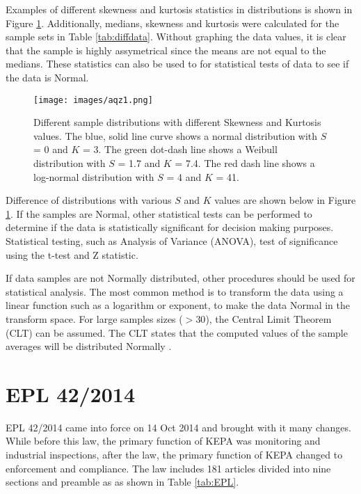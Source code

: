 Examples of different skewness and kurtosis statistics in distributions is shown in Figure \ref{fig:distr}. Additionally, medians, skewness and kurtosis were calculated for the sample sets in Table \ref{tab:diffdata}. Without graphing the data values, it is clear that the sample is highly assymetrical since the means are not equal to the medians. These statistics can also be used to for statistical tests of data to see if the data is Normal. 
%
\begin{figure}[!htpb]
\centering
\texttt{[image: images/aqz1.png]} 
\caption[Different sample distributions with different Skewness and Kurtosis values.]{Different sample distributions with different Skewness and Kurtosis values. The blue, solid line curve shows a normal distribution with $S$ = 0 and $K$ = 3. The green dot-dash line shows a Weibull distribution with $S$ = 1.7 and $K$ = 7.4.  The red dash line shows a log-normal distribution with $S$ = 4 and $K$ = 41. }
\label{fig:distr}
\end{figure}
%
Difference of distributions with various $S$ and $K$ values are shown below in Figure \ref{fig:distr}.  If the samples are Normal, other statistical tests can be performed to determine if the data is statistically significant for decision making purposes. Statistical testing, such as Analysis of Variance (ANOVA), test of significance using the t-test and Z statistic.

If data samples are not Normally distributed, other procedures should be used for statistical analysis. The most common method is to transform the data using a linear function such as a logarithm or exponent, to make the data Normal in the transform space. For large samples sizes ($>30$), the Central Limit Theorem (CLT) can be assumed. The CLT states that the computed values of the sample averages will be distributed Normally \citep{Freeman2017a}. 

\section{EPL 42/2014}

EPL 42/2014 came into force on 14 Oct 2014 and brought with it many changes. While before this law, the primary function of KEPA was monitoring and industrial inspections, after the law, the primary function of KEPA changed to enforcement and compliance. The law includes 181 articles divided into nine sections and preamble as as shown in Table \ref{tab:EPL}.

